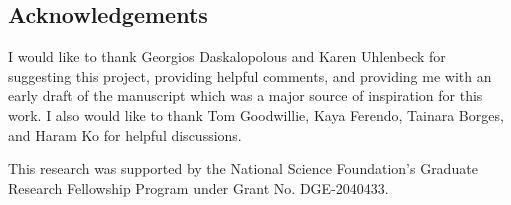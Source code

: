 \documentclass[reqno,11pt]{amsart}
\theoremstyle{definition}
\numberwithin{equation}{section}
\begin{document}
\subsection{Acknowledgements}
I would like to thank Georgios Daskalopolous and Karen Uhlenbeck for suggesting this project, providing helpful comments, and providing me with an early draft of the manuscript \cite{daskalopoulos2023} which was a major source of inspiration for this work.
I also would like to thank Tom Goodwillie, Kaya Ferendo, Tainara Borges, and Haram Ko for helpful discussions.

This research was supported by the National Science Foundation's Graduate Research Fellowship Program under Grant No. DGE-2040433.


\end{document}
